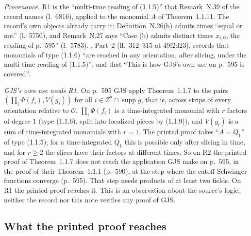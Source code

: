 \documentclass[11pt,a4paper]{article}
\DeclareMathOperator{\supp}{supp}
\theoremstyle{plain}
\theoremstyle{definition}
\begin{document}
\emph{Provenance.}  R1 is the ``multi-time reading of (1.1.5)'' that Remark~N.39 of the record
names (l.~6816), applied to the monomial $A$ of Theorem~1.1.11.  The record's own objects
already carry it: Definition~N.26(b) admits times ``equal or not'' (l.~5750), and Remark~N.27
says ``Case (b) admits distinct times $x_{i,0}$, the reading of p.~595'' (l.~5783).
, Part~2 (ll.~312--315 at 49f2d23), records that monomials of type (1.1.6)
``are reached in any orientation, after slicing, under the multi-time reading of (1.1.5)'',
and that ``This is how GJS's own use on p.~595 is covered''.

\emph{GJS's own use needs R1.}  On p.~595 GJS apply Theorem~1.1.7 to the pairs
$(\prod_i\Phi(f_i),V(g_i))$ for all $i\in Z^2\cap\supp g$, that is, across strips of every
orientation relative to $\mathcal O$.  $\prod_i\Phi(f_i)$ is a time-integrated monomial with
$r$ factors of degree $1$ (type (1.1.6), split into localized pieces by (1.1.9)), and $V(g_i)$ is
a sum of time-integrated monomials with $r=1$.  The printed proof takes ``$A=Q_1$'' of type
(1.1.5); for a time-integrated $Q_1$ this is possible only after slicing in time, and for $r\ge2$
the slices have their factors at different times.  So on R2 the printed proof of Theorem~1.1.7
does not reach the application GJS make on p.~595, in the proof of their Theorem~1.1.1 (p.~590),
at the step where the cutoff Schwinger functions converge (p.~595).  That step needs products
of at least two fields.  On R1 the printed proof reaches it.  This is an observation about the
source's logic; neither the record nor this note verifies any proof of GJS.

\subsection{What the printed proof reaches}
\end{document}
